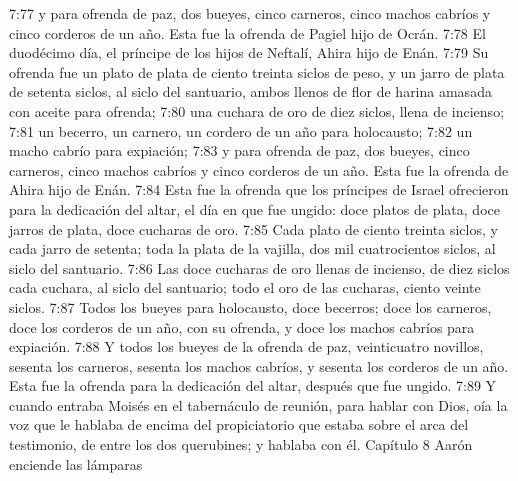7:77 y para ofrenda de paz, dos bueyes, cinco carneros, cinco machos cabríos y cinco corderos de un año. Esta fue la ofrenda de Pagiel hijo de Ocrán.  
7:78 El duodécimo día, el príncipe de los hijos de Neftalí, Ahira hijo de Enán.  
7:79 Su ofrenda fue un plato de plata de ciento treinta siclos de peso,  y un jarro de plata de setenta siclos, al siclo del santuario, ambos llenos de flor de harina amasada con aceite para ofrenda;  
7:80 una cuchara de oro de diez siclos,  llena de incienso;  
7:81 un becerro, un carnero, un cordero de un año para holocausto;  
7:82 un macho cabrío para expiación;  
7:83 y para ofrenda de paz, dos bueyes, cinco carneros, cinco machos cabríos y cinco corderos de un año. Esta fue la ofrenda de Ahira hijo de Enán.  
7:84 Esta fue la ofrenda que los príncipes de Israel ofrecieron para la dedicación del altar, el día en que fue ungido: doce platos de plata, doce jarros de plata, doce cucharas de oro.  
7:85 Cada plato de ciento treinta siclos,  y cada jarro de setenta; toda la plata de la vajilla, dos mil cuatrocientos siclos, al siclo del santuario.  
7:86 Las doce cucharas de oro llenas de incienso, de diez siclos   cada cuchara, al siclo del santuario; todo el oro de las cucharas, ciento veinte siclos.  
7:87 Todos los bueyes para holocausto, doce becerros; doce los carneros, doce los corderos de un año, con su ofrenda, y doce los machos cabríos para expiación.  
7:88 Y todos los bueyes de la ofrenda de paz, veinticuatro novillos, sesenta los carneros, sesenta los machos cabríos, y sesenta los corderos de un año. Esta fue la ofrenda para la dedicación del altar, después que fue ungido.  
7:89 Y cuando entraba Moisés en el tabernáculo de reunión, para hablar con Dios, oía la voz que le hablaba de encima del propiciatorio que estaba sobre el arca del testimonio, de entre los dos querubines; y hablaba con él.  
Capítulo 8
Aarón enciende las lámparas  

